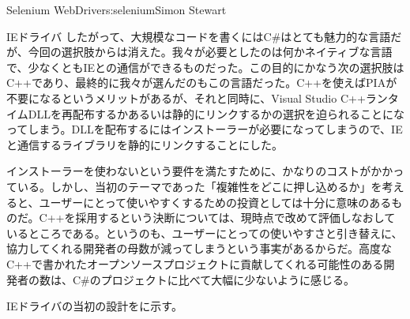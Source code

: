 \begin{aosachapter}{Selenium WebDriver}{s:selenium}{Simon Stewart}
\begin{aosasect1}{IEドライバ}
したがって、大規模なコードを書くにはC\#はとても魅力的な言語だが、今回の選択肢からは消えた。我々が必要としたのは何かネイティブな言語で、少なくともIEとの通信ができるものだった。この目的にかなう次の選択肢はC++であり、最終的に我々が選んだのもこの言語だった。C++を使えばPIAが不要になるというメリットがあるが、それと同時に、Visual Studio C++ランタイムDLLを再配布するかあるいは静的にリンクするかの選択を迫られることになってしまう。DLLを配布するにはインストーラーが必要になってしまうので、IEと通信するライブラリを静的にリンクすることにした。

インストーラーを使わないという要件を満たすために、かなりのコストがかかっている。しかし、当初のテーマであった「複雑性をどこに押し込めるか」を考えると、ユーザーにとって使いやすくするための投資としては十分に意味のあるものだ。C++を採用するという決断については、現時点で改めて評価しなおしているところである。というのも、ユーザーにとっての使いやすさと引き替えに、協力してくれる開発者の母数が減ってしまうという事実があるからだ。高度なC++で書かれたオープンソースプロジェクトに貢献してくれる可能性のある開発者の数は、C\#のプロジェクトに比べて大幅に少ないように感じる。

IEドライバの当初の設計をに示す。



\end{aosasect1}
\end{aosachapter}
